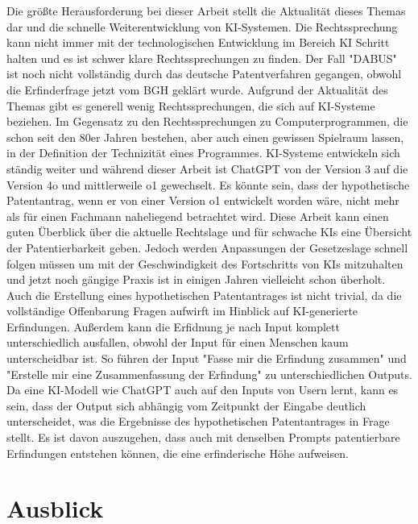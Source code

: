 Die größte Herausforderung bei dieser Arbeit stellt
die Aktualität dieses Themas dar und die 
schnelle Weiterentwicklung von KI-Systemen.
Die Rechtssprechung kann nicht immer mit der 
technologischen Entwicklung im Bereich KI
Schritt halten und es ist schwer
klare Rechtssprechungen zu finden. Der Fall
"DABUS" ist noch nicht vollständig durch das 
deutsche Patentverfahren
gegangen, obwohl die Erfinderfrage jetzt vom
BGH geklärt wurde. Aufgrund der Aktualität des Themas gibt
es generell wenig Rechtssprechungen, die sich auf
KI-Systeme beziehen. Im Gegensatz zu den Rechtssprechungen
zu Computerprogrammen, die schon seit den 80er Jahren
bestehen, aber auch einen gewissen Spielraum lassen,
in der Definition der Technizität eines Programmes. KI-Systeme
entwickeln sich ständig weiter und während dieser Arbeit 
ist ChatGPT von der Version 3 auf die Version 4o und mittlerweile
o1 gewechselt. Es könnte sein, dass der hypothetische
Patentantrag, wenn er von einer Version o1 entwickelt 
worden wäre, nicht mehr als für
einen Fachmann naheliegend betrachtet wird. Diese Arbeit
kann einen guten Überblick über die aktuelle Rechtslage 
und für schwache KIs eine Übersicht der Patentierbarkeit geben.
Jedoch werden Anpassungen der Gesetzeslage schnell 
folgen müssen um mit der Geschwindigkeit des Fortschritts von
KIs mitzuhalten und jetzt noch gängige Praxis ist in 
einigen Jahren vielleicht schon überholt.
Auch die Erstellung eines hypothetischen Patentantrages
ist nicht trivial, da die vollständige Offenbarung
Fragen aufwirft im Hinblick auf KI-generierte 
Erfindungen. Außerdem kann die Erfidnung je nach 
Input komplett unterschiedlich ausfallen, obwohl 
der Input für einen Menschen kaum unterscheidbar ist.
So führen der Input "Fasse mir die Erfindung zusammen"
und "Erstelle mir eine Zusammenfassung der Erfindung" zu
unterschiedlichen Outputs. Da eine KI-Modell wie 
ChatGPT auch auf den Inputs von Usern lernt,
kann es sein, dass der Output sich abhängig vom 
Zeitpunkt der Eingabe deutlich unterscheidet, was die
Ergebnisse des hypothetischen Patentantrages in Frage 
stellt. Es ist davon auszugehen, dass auch mit denselben 
Prompts patentierbare Erfindungen entstehen können, 
die eine erfinderische Höhe aufweisen. 

\section{Ausblick\label{sec:outlook}}

